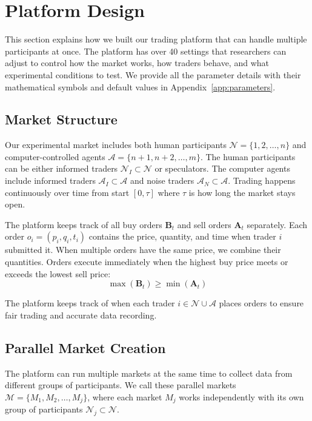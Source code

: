 \section{Platform Design}
\label{sec:platform}

This section explains how we built our trading platform that can handle multiple participants at once. The platform has over 40 settings that researchers can adjust to control how the market works, how traders behave, and what experimental conditions to test. We provide all the parameter details with their mathematical symbols and default values in Appendix~\ref{app:parameters}.

\subsection{Market Structure}
\label{sec:market}

Our experimental market includes both human participants $\mathcal{N} = \{1, 2, \ldots, n\}$ and computer-controlled agents $\mathcal{A} = \{n+1, n+2, \ldots, m\}$. The human participants can be either informed traders $\mathcal{N}_I \subset \mathcal{N}$ or speculators. The computer agents include informed traders $\mathcal{A}_I \subset \mathcal{A}$ and noise traders $\mathcal{A}_N \subset \mathcal{A}$. Trading happens continuously over time from start $[0, \tau]$ where $\tau$ is how long the market stays open.

The platform keeps track of all buy orders $\mathbf{B}_t$ and sell orders $\mathbf{A}_t$ separately. Each order $o_i = (p_i, q_i, t_i)$ contains the price, quantity, and time when trader $i$ submitted it. When multiple orders have the same price, we combine their quantities. Orders execute immediately when the highest buy price meets or exceeds the lowest sell price:
\begin{equation}
\max(\mathbf{B}_t) \geq \min(\mathbf{A}_t)
\end{equation}

The platform keeps track of when each trader $i \in \mathcal{N} \cup \mathcal{A}$ places orders to ensure fair trading and accurate data recording.

\subsection{Parallel Market Creation}
\label{sec:sessions}

The platform can run multiple markets at the same time to collect data from different groups of participants. We call these parallel markets $\mathcal{M} = \{M_1, M_2, \ldots, M_j\}$, where each market $M_j$ works independently with its own group of participants $\mathcal{N}_j \subset \mathcal{N}$.

